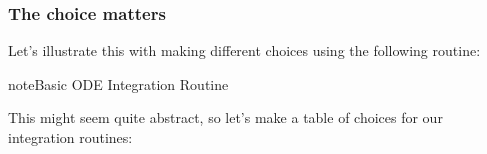 \documentclass[letterpaper,10pt,english]{jupyterBook}
\begin{document}
\subsubsection{The choice matters}
\label{\detokenize{content/2_oscillations/activity-SHO-numerical:the-choice-matters}}
\sphinxAtStartPar
Let’s illustrate this with making different choices using the following routine:

\begin{sphinxadmonition}{note}{Basic ODE Integration Routine}

\begin{sphinxVerbatim}[commandchars=\\\{\}]
  
  
  

  
  
   
  

  

   

      
      
      
    
    
      
\end{sphinxVerbatim}
\end{sphinxadmonition}

\begin{sphinxVerbatim}[commandchars=\\\{\}]

\end{sphinxVerbatim}

\sphinxAtStartPar
This might seem quite abstract, so let’s make a table of choices for our integration routines:
\end{document}
